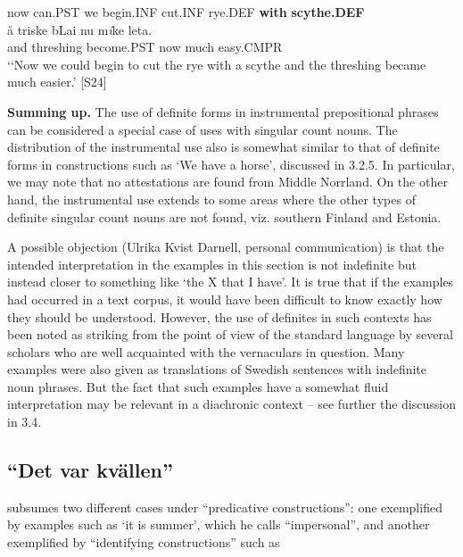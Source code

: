 now  can.PST  we  begin.INF  cut.INF  rye.DEF  \textbf{with} \textbf{scythe.DEF}\\

 \ea\label{}
\gll å  triske  bLai  nu  m\textit{i}ke  leta.\\


and  threshing  become.PST  now  much   easy.CMPR\\

\glt ‘‘Now we could begin to cut the rye with a scythe and the threshing became much easier.’ [S24]

\z

\textbf{Summing up.} The use of definite forms in instrumental prepositional phrases can be considered a special case of uses with singular count nouns. The distribution of the instrumental use also is somewhat similar to that of definite forms in constructions such as ‘We have a horse’, discussed in 3.2.5. In particular, we may note that no attestations are found from Middle Norrland. On the other hand, the instrumental use extends to some areas where the other types of definite singular count nouns are not found, viz. southern Finland and Estonia. 


A possible objection (Ulrika Kvist Darnell, personal communication) is that the intended interpretation in the examples in this section is not indefinite but instead closer to something like ‘the X that I have’. It is true that if the examples had occurred in a text corpus, it would have been difficult to know exactly how they should be understood. However, the use of definites in such contexts has been noted as striking from the point of view of the standard language by several scholars who are well acquainted with the vernaculars in question. Many examples were also given as translations of Swedish sentences with indefinite noun phrases. But the fact that such examples have a somewhat fluid interpretation may be relevant in a diachronic context – see further the discussion in 3.4. 


\subsection{\rmfamily  “Det var kvällen”}
\label{bkm:Ref224379336}
\citet[16]{Delsing2003a} subsumes two different cases under “predicative constructions”: one exemplified by examples such as  ‘it is summer’, which he calls “impersonal”, and another exemplified by “identifying constructions” such as 


